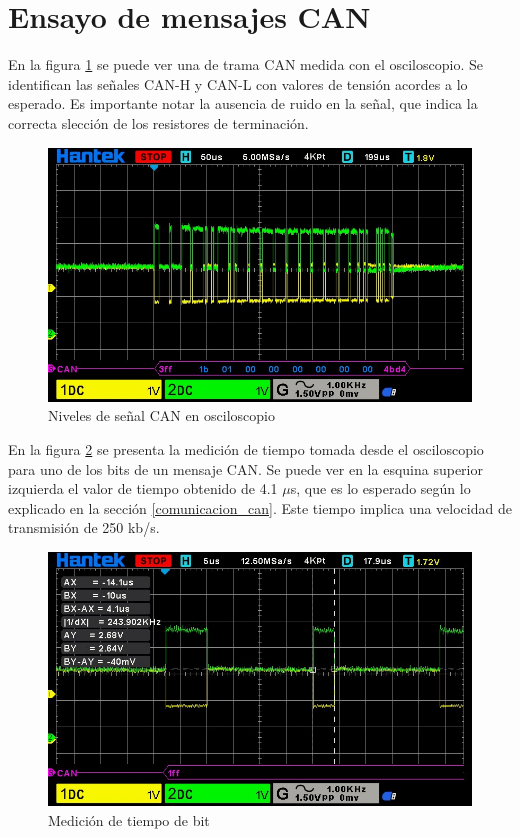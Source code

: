 \section{Ensayo de mensajes CAN}

En la figura \ref{fig:niv_señal} se puede ver una de trama CAN medida con el osciloscopio. Se identifican las señales CAN-H y CAN-L con valores de tensión acordes a lo esperado. Es importante notar la ausencia de ruido en la señal, que indica la correcta slección de los resistores de terminación.

\begin{figure}[htbp]
	\centering
	\includegraphics[scale=0.6]{./Figures/Message_Change_Operation_Mode_CONFIG.jpg}
	\caption{Niveles de señal CAN en osciloscopio}
	\label{fig:niv_señal}
\end{figure}

En la figura \ref{fig:tiempo_bit_can} se presenta la medición de tiempo tomada desde el osciloscopio para uno de los bits de un mensaje CAN. Se puede ver en la esquina superior izquierda el valor de tiempo obtenido de 4.1 $\mu$s, que es lo esperado según lo explicado en la sección \ref{comunicacion_can}. Este tiempo implica una velocidad de transmisión de 250 kb/s.

\begin{figure}[htbp]
	\centering
	\includegraphics[scale=0.6]{./Figures/bit_time_can.jpeg}
	\caption{Medición de tiempo de bit}
	\label{fig:tiempo_bit_can}
\end{figure}

